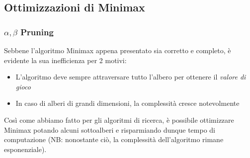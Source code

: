\subsection{Ottimizzazioni di Minimax}
\subsubsection{$\alpha,\beta$ Pruning}
Sebbene l'algoritmo Minimax appena presentato sia corretto e completo, è evidente la sua inefficienza per 2 motivi:
\begin{itemize}
    \item L'algoritmo deve sempre attraversare tutto l'albero per ottenere il \textit{valore di gioco}
    \item In caso di alberi di grandi dimensioni, la complessità cresce notevolmente
\end{itemize}
Così come abbiamo fatto per gli algoritmi di ricerca, è possibile ottimizzare Minimax potando alcuni sottoalberi e risparmiando
dunque tempo di computazione (NB: nonostante ciò, la complessità dell'algoritmo rimane esponenziale).


